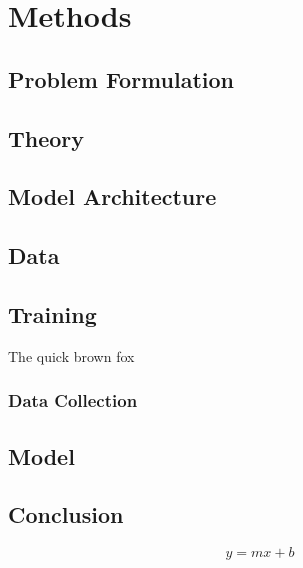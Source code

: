 \chapter{Methods}
\section{Problem Formulation}
\section{Theory}
\section{Model Architecture}
\section{Data}
\section{Training}

\lipsum[12]
\begin{table}
  \centering
  \caption{The quick brown fox}
  
\end{table}
\lipsum[13]
\subsection{Data Collection}
\lipsum[16]
\section{Model}
\section{Conclusion}
\lipsum[20]
\begin{equation}
  y = mx + b
\end{equation}
\lipsum[22-25]